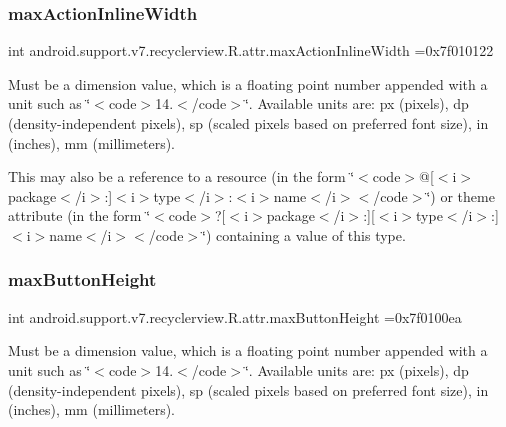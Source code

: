 \subsubsection{\texorpdfstring{max\+Action\+Inline\+Width}{maxActionInlineWidth}}
{\footnotesize\ttfamily int android.\+support.\+v7.\+recyclerview.\+R.\+attr.\+max\+Action\+Inline\+Width =0x7f010122\hspace{0.3cm}{\ttfamily [static]}}

Must be a dimension value, which is a floating point number appended with a unit such as \char`\"{}$<$code$>$14.\+5sp$<$/code$>$\char`\"{}. Available units are\+: px (pixels), dp (density-\/independent pixels), sp (scaled pixels based on preferred font size), in (inches), mm (millimeters). 

This may also be a reference to a resource (in the form \char`\"{}$<$code$>$@\mbox{[}$<$i$>$package$<$/i$>$\+:\mbox{]}$<$i$>$type$<$/i$>$\+:$<$i$>$name$<$/i$>$$<$/code$>$\char`\"{}) or theme attribute (in the form \char`\"{}$<$code$>$?\mbox{[}$<$i$>$package$<$/i$>$\+:\mbox{]}\mbox{[}$<$i$>$type$<$/i$>$\+:\mbox{]}$<$i$>$name$<$/i$>$$<$/code$>$\char`\"{}) containing a value of this type. \mbox{\label{classandroid_1_1support_1_1v7_1_1recyclerview_1_1R_1_1attr_a6d9b57f95f65fa9612d1b5bcb02fbaa1}} 
\subsubsection{\texorpdfstring{max\+Button\+Height}{maxButtonHeight}}
{\footnotesize\ttfamily int android.\+support.\+v7.\+recyclerview.\+R.\+attr.\+max\+Button\+Height =0x7f0100ea\hspace{0.3cm}{\ttfamily [static]}}

Must be a dimension value, which is a floating point number appended with a unit such as \char`\"{}$<$code$>$14.\+5sp$<$/code$>$\char`\"{}. Available units are\+: px (pixels), dp (density-\/independent pixels), sp (scaled pixels based on preferred font size), in (inches), mm (millimeters). 

